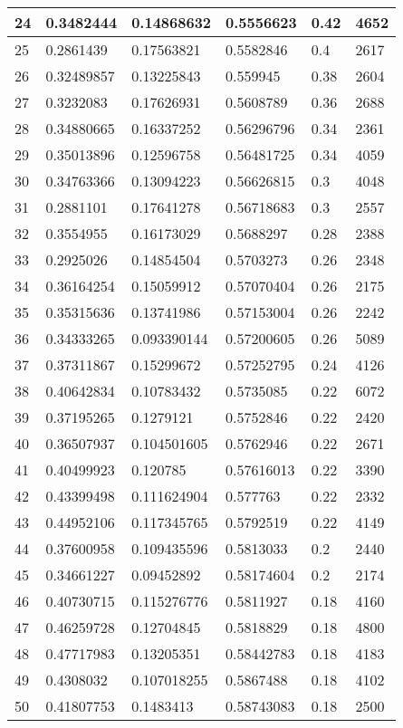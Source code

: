 \begin{longtable}{|l|l|l|l|l|l|}
24 & 0.3482444 & 0.14868632 & 0.5556623 & 0.42 & 4652 \\ \hline 
25 & 0.2861439 & 0.17563821 & 0.5582846 & 0.4 & 2617 \\ \hline 
26 & 0.32489857 & 0.13225843 & 0.559945 & 0.38 & 2604 \\ \hline 
27 & 0.3232083 & 0.17626931 & 0.5608789 & 0.36 & 2688 \\ \hline 
28 & 0.34880665 & 0.16337252 & 0.56296796 & 0.34 & 2361 \\ \hline 
29 & 0.35013896 & 0.12596758 & 0.56481725 & 0.34 & 4059 \\ \hline 
30 & 0.34763366 & 0.13094223 & 0.56626815 & 0.3 & 4048 \\ \hline 
31 & 0.2881101 & 0.17641278 & 0.56718683 & 0.3 & 2557 \\ \hline 
32 & 0.3554955 & 0.16173029 & 0.5688297 & 0.28 & 2388 \\ \hline 
33 & 0.2925026 & 0.14854504 & 0.5703273 & 0.26 & 2348 \\ \hline 
34 & 0.36164254 & 0.15059912 & 0.57070404 & 0.26 & 2175 \\ \hline 
35 & 0.35315636 & 0.13741986 & 0.57153004 & 0.26 & 2242 \\ \hline 
36 & 0.34333265 & 0.093390144 & 0.57200605 & 0.26 & 5089 \\ \hline 
37 & 0.37311867 & 0.15299672 & 0.57252795 & 0.24 & 4126 \\ \hline 
38 & 0.40642834 & 0.10783432 & 0.5735085 & 0.22 & 6072 \\ \hline 
39 & 0.37195265 & 0.1279121 & 0.5752846 & 0.22 & 2420 \\ \hline 
40 & 0.36507937 & 0.104501605 & 0.5762946 & 0.22 & 2671 \\ \hline 
41 & 0.40499923 & 0.120785 & 0.57616013 & 0.22 & 3390 \\ \hline 
42 & 0.43399498 & 0.111624904 & 0.577763 & 0.22 & 2332 \\ \hline 
43 & 0.44952106 & 0.117345765 & 0.5792519 & 0.22 & 4149 \\ \hline 
44 & 0.37600958 & 0.109435596 & 0.5813033 & 0.2 & 2440 \\ \hline 
45 & 0.34661227 & 0.09452892 & 0.58174604 & 0.2 & 2174 \\ \hline 
46 & 0.40730715 & 0.115276776 & 0.5811927 & 0.18 & 4160 \\ \hline 
47 & 0.46259728 & 0.12704845 & 0.5818829 & 0.18 & 4800 \\ \hline 
48 & 0.47717983 & 0.13205351 & 0.58442783 & 0.18 & 4183 \\ \hline 
49 & 0.4308032 & 0.107018255 & 0.5867488 & 0.18 & 4102 \\ \hline 
50 & 0.41807753 & 0.1483413 & 0.58743083 & 0.18 & 2500 \\ \hline 
\end{longtable}